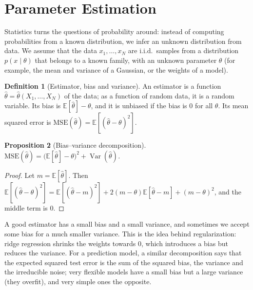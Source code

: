 \documentclass[11pt]{article}
\newcommand{\E}{\mathbb{E}}
\DeclareMathOperator{\Var}{Var}
\theoremstyle{definition}
\newtheorem{definition}{Definition}[section]
\theoremstyle{plain}
\newtheorem{proposition}[definition]{Proposition}
\theoremstyle{remark}
\begin{document}
\section{Parameter Estimation}\label{sec:estimation}

Statistics turns the questions of probability around: instead of computing probabilities from a known distribution, we infer an unknown distribution from data. We assume that the data $x_1, \ldots, x_N$ are i.i.d.\ samples from a distribution $p(x \mid \theta)$ that belongs to a known family, with an unknown parameter $\theta$ (for example, the mean and variance of a Gaussian, or the weights of a model).

\begin{definition}[Estimator, bias and variance]\label{def:estimator}
    An estimator is a function $\hat\theta = \hat\theta(X_1, \ldots, X_N)$ of the data; as a function of random data, it is a random variable. Its bias is $\E[\hat\theta] - \theta$, and it is unbiased if the bias is $0$ for all $\theta$. Its mean squared error is $\mathrm{MSE}(\hat\theta) = \E[(\hat\theta - \theta)^2]$.
\end{definition}

\begin{proposition}[Bias--variance decomposition]\label{prop:bias-variance}
    $\mathrm{MSE}(\hat\theta) = \big(\E[\hat\theta] - \theta\big)^2 + \Var(\hat\theta)$.
\end{proposition}

\begin{proof}
    Let $m = \E[\hat\theta]$. Then $\E[(\hat\theta - \theta)^2] = \E[(\hat\theta - m)^2] + 2(m - \theta)\E[\hat\theta - m] + (m - \theta)^2$, and the middle term is $0$.
\end{proof}

A good estimator has a small bias and a small variance, and sometimes we accept some bias for a much smaller variance. This is the idea behind regularization: ridge regression shrinks the weights towards $0$, which introduces a bias but reduces the variance. For a prediction model, a similar decomposition says that the expected squared test error is the sum of the squared bias, the variance and the irreducible noise; very flexible models have a small bias but a large variance (they overfit), and very simple ones the opposite.
\end{document}
